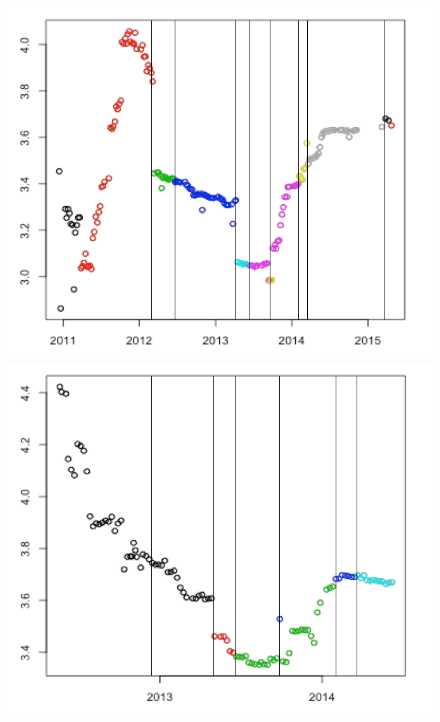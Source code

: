 \begin{figure}[htb]
\centering
\begin{minipage}{.45\linewidth}
\centering
\includegraphics[width=\linewidth]{figs/model1.png}
\end{minipage}
\begin{minipage}{.45\linewidth}
\centering
\includegraphics[width=\linewidth]{figs/model2.png}
\end{minipage}
\begin{minipage}{.45\linewidth}
\centering

\end{minipage}
\end{figure}
